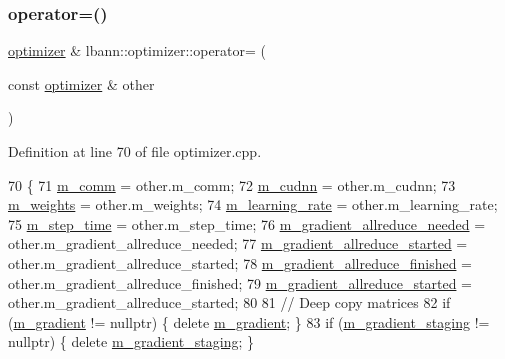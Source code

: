 \subsubsection{\texorpdfstring{operator=()}{operator=()}}
{\footnotesize\ttfamily \hyperlink{classlbann_1_1optimizer}{optimizer} \& lbann\+::optimizer\+::operator= (\begin{DoxyParamCaption}\item[{const \hyperlink{classlbann_1_1optimizer}{optimizer} \&}]{other }\end{DoxyParamCaption})}



Definition at line 70 of file optimizer.\+cpp.


\begin{DoxyCode}
70                                                       \{
71   \hyperlink{classlbann_1_1optimizer_a8c2569a8fcf0ee969517067b81896c44}{m\_comm} = other.m\_comm;
72   \hyperlink{classlbann_1_1optimizer_a2f24dbeaca18b06f4aa7d179bbf96680}{m\_cudnn} = other.m\_cudnn;
73   \hyperlink{classlbann_1_1optimizer_a33b57b578a089d9ffe6715bb3996907c}{m\_weights} = other.m\_weights;
74   \hyperlink{classlbann_1_1optimizer_ad393dcdcb82b44510c586ed5ec46d4dd}{m\_learning\_rate} = other.m\_learning\_rate;
75   \hyperlink{classlbann_1_1optimizer_afc424c715008fb4d900548f7934ea856}{m\_step\_time} = other.m\_step\_time;
76   \hyperlink{classlbann_1_1optimizer_a2dc18dcc3cf9510947304c3c5d059eb0}{m\_gradient\_allreduce\_needed} = other.m\_gradient\_allreduce\_needed;
77   \hyperlink{classlbann_1_1optimizer_ac77740a916f397600efae0c03bc5a045}{m\_gradient\_allreduce\_started} = other.m\_gradient\_allreduce\_started;
78   \hyperlink{classlbann_1_1optimizer_a4d332551d05e245ad3f862653b5af65a}{m\_gradient\_allreduce\_finished} = other.m\_gradient\_allreduce\_finished;
79   \hyperlink{classlbann_1_1optimizer_ac77740a916f397600efae0c03bc5a045}{m\_gradient\_allreduce\_started} = other.m\_gradient\_allreduce\_started;
80 
81   \textcolor{comment}{// Deep copy matrices}
82   \textcolor{keywordflow}{if} (\hyperlink{classlbann_1_1optimizer_a3df20cb0ae2b60430ad4fd235d66c12e}{m\_gradient} != \textcolor{keyword}{nullptr}) \{ \textcolor{keyword}{delete} \hyperlink{classlbann_1_1optimizer_a3df20cb0ae2b60430ad4fd235d66c12e}{m\_gradient}; \}
83   \textcolor{keywordflow}{if} (\hyperlink{classlbann_1_1optimizer_a92cd058d4f9fc8162d36d52461a96df2}{m\_gradient\_staging} != \textcolor{keyword}{nullptr}) \{ \textcolor{keyword}{delete} 
      \hyperlink{classlbann_1_1optimizer_a92cd058d4f9fc8162d36d52461a96df2}{m\_gradient\_staging}; \}

\end{DoxyCode}
